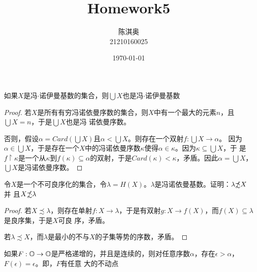 \documentclass[11pt]{article}
\author{陈淇奥\\21210160025}
\date{\today}
\title{Homework5}
\begin{document}
\maketitle
\begin{exercise}[2.1.31]
如果\(X\)是冯\(\cdot\)诺伊曼基数的集合，则\(\bigcup X\)也是冯\(\cdot\)诺伊曼基数
\end{exercise}

\begin{proof}
若\(X\)是所有有穷冯诺依曼序数的集合，则\(X\)中有一个最大的元素\(n\)，且\(\bigcup X=n\)，于是\(\bigcup X\)也是冯
诺依曼序数。

否则，假设\(\alpha=Card(\bigcup X)\)且\(\alpha<\bigcup X\)。则存在一个双射\(f:\bigcup X\to\alpha\)。
因为\(\alpha\in\bigcup X\)，于是存在一个\(X\)中的冯诺依曼序数\(\kappa\)使得\(\alpha\in\kappa\)。因为\(\kappa\subseteq\bigcup X\)，于
是\(f\upharpoonright\kappa\)是一个从\(\kappa\)到\(f(\kappa)\subseteq\alpha\)的双射，于是\(Card(\kappa)<\kappa\)，矛盾。因此\(\alpha=\bigcup X\)，
\(\bigcup X\)是冯诺依曼序数。
\end{proof}

\begin{exercise}[2.1.39]
令\(X\)是一个不可良序化的集合，令\(\lambda=H(X)\)。\(\lambda\)是冯诺依曼基数。证明：\(\lambda\slashed{\precsim} X\)并
且\(X\slashed{\precsim}\lambda\)
\end{exercise}

\begin{proof}
若\(X\precsim\lambda\)，则存在单射\(f:X\to\lambda\)，于是有双射\(g:X\to f(X)\)，而\(f(X)\subseteq\lambda\)是良序集，于是\(X\)可良
序，矛盾。

若\(\lambda\precsim X\)，而\(\lambda\)是最小的不与\(X\)的子集等势的序数，矛盾。
\end{proof}

\begin{exercise}[2.1.37]
如果\(F:\mathbb{O}\to\mathbb{O}\)是严格递增的，并且是连续的，则对任意序数\(\alpha\)，存在\(\epsilon>\alpha\)，\(F(\epsilon)=\epsilon\)。即，\(F\)有任意
大的不动点
\end{exercise}
\end{document}
